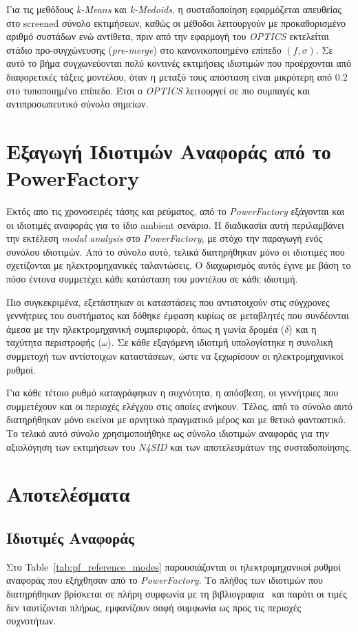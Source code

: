 \documentclass[a4paper,12pt,twoside,openright]{report}
\begin{document}
  Για τις μεθόδους \textit{k-Means} και \textit{k-Medoids}, η συσταδοποίηση εφαρμόζεται απευθείας στο screened σύνολο εκτιμήσεων, καθώς οι μέθοδοι λειτουργούν με προκαθορισμένο αριθμό συστάδων ενώ αντίθετα, πριν από την εφαρμογή του \textit{OPTICS} εκτελείται στάδιο προ-συγχώνευσης (\textit{pre-merge}) στο κανονικοποιημένο επίπεδο \((f,\sigma)\). Σε αυτό το βήμα συγχωνεύονται πολύ κοντινές εκτιμήσεις ιδιοτιμών που προέρχονται από διαφορετικές τάξεις μοντέλου, όταν η μεταξύ τους απόσταση είναι μικρότερη από \(0.2\) στο τυποποιημένο επίπεδο. Έτσι ο \textit{OPTICS} λειτουργεί σε πιο συμπαγές και αντιπροσωπευτικό σύνολο σημείων.

\chapter{Εξαγωγή Ιδιοτιμών Αναφοράς από το PowerFactory}
Εκτός απο τις χρονοσειρές τάσης και ρεύματος, από το \textit{PowerFactory} εξάγονται και οι ιδιοτιμές αναφοράς για το ίδιο ambient σενάριο. Η διαδικασία αυτή περιλαμβάνει την εκτέλεση \textit{modal analysis} στο \textit{PowerFactory}, με στόχο την παραγωγή ενός συνόλου ιδιοτιμών. Από το σύνολο αυτό, τελικά διατηρήθηκαν μόνο οι ιδιοτιμές που σχετίζονται με ηλεκτρομηχανικές ταλαντώσεις. Ο διαχωρισμός αυτός έγινε με βάση το πόσο έντονα συμμετέχει κάθε κατάσταση του μοντέλου σε κάθε ιδιοτιμή.

Πιο συγκεκριμένα, εξετάστηκαν οι καταστάσεις που αντιστοιχούν στις σύγχρονες γεννήτριες του συστήματος και δόθηκε έμφαση κυρίως σε μεταβλητές που συνδέονται άμεσα με την ηλεκτρομηχανική συμπεριφορά, όπως η γωνία δρομέα ($\delta$) και η ταχύτητα περιστροφής ($\omega$). Σε κάθε εξαγόμενη ιδιοτιμή υπολογίστηκε η συνολική συμμετοχή των αντίστοιχων καταστάσεων, ώστε να ξεχωρίσουν οι ηλεκτρομηχανικοί ρυθμοί.

Για κάθε τέτοιο ρυθμό καταγράφηκαν η συχνότητα, η απόσβεση, οι γεννήτριες που συμμετέχουν και οι περιοχές ελέγχου στις οποίες ανήκουν. Τέλος, από το σύνολο αυτό διατηρήθηκαν μόνο εκείνοι με αρνητικό πραγματικό μέρος και με θετικό φανταστικό. Το τελικό αυτό σύνολο χρησιμοποιήθηκε ως σύνολο ιδιοτιμών αναφοράς για την αξιολόγηση των εκτιμήσεων του \textit{N4SID} και των αποτελεσμάτων της συσταδοποίησης.


\chapter{Αποτελέσματα}
\section{Ιδιοτιμές Αναφοράς}
Στο Table~\ref{tab:pf_reference_modes} παρουσιάζονται οι ηλεκτρομηχανικοί ρυθμοί αναφοράς που εξήχθησαν από το \textit{PowerFactory}. Το πλήθος των ιδιοτιμών που διατηρήθηκαν βρίσκεται σε πλήρη συμφωνία με τη βιβλιογραφια~\cite{sarkar2024drga} και παρότι οι τιμές δεν ταυτίζονται πλήρως, εμφανίζουν σαφή συμφωνία ως προς τις περιοχές συχνοτήτων.
\end{document}
